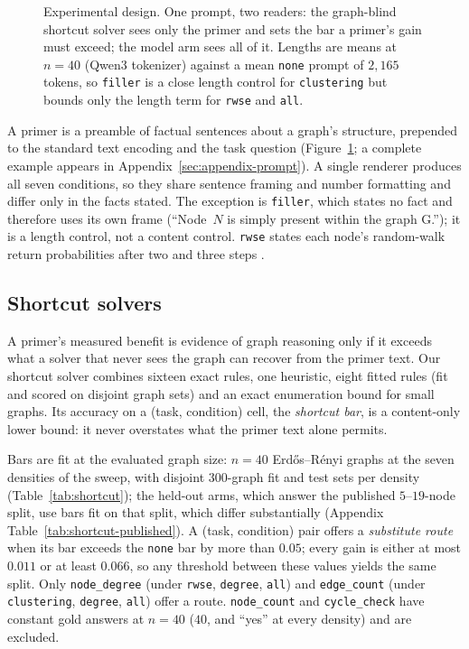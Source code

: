 \documentclass[11pt]{article}
\begin{document}
\begin{figure}[t]
\caption{Experimental design. One prompt, two readers: the graph-blind
shortcut solver sees only the primer and sets the bar a primer's gain must
exceed; the model arm sees all of it. Lengths are means at $n{=}40$ (Qwen3
tokenizer) against a mean \texttt{none} prompt of $2{,}165$ tokens, so
\texttt{filler} is a close length control for \texttt{clustering} but
bounds only the length term for \texttt{rwse} and \texttt{all}.}
\label{fig:design}
\end{figure}

A primer is a preamble of factual sentences about a graph's structure,
prepended to the standard text encoding and the task question
(Figure~\ref{fig:design}; a complete example appears in
Appendix~\ref{sec:appendix-prompt}). A single renderer produces all seven
conditions, so they share sentence framing and number formatting and differ
only in the facts stated. The exception is \texttt{filler}, which states no
fact and therefore uses its own frame (``Node~$N$ is simply present within
the graph G.''); it is a length control, not a content control.
\texttt{rwse} states each node's random-walk return probabilities after two
and three steps \citep{dwivedi2022graph}.

\subsection{Shortcut solvers}
\label{sec:shortcuts}

A primer's measured benefit is evidence of graph reasoning only if it
exceeds what a solver that never sees the graph can recover from the
primer text. Our shortcut solver combines sixteen exact rules, one
heuristic, eight fitted rules (fit and scored on disjoint graph sets) and an
exact enumeration bound for small graphs. Its accuracy on a (task,
condition) cell, the \emph{shortcut bar}, is a content-only lower bound: it
never overstates what the primer text alone permits.

Bars are fit at the evaluated graph size: $n{=}40$ Erd\H{o}s--R\'enyi
graphs at the seven densities of the sweep, with disjoint $300$-graph fit
and test sets per density (Table~\ref{tab:shortcut}); the held-out arms,
which answer the published $5$--$19$-node split, use bars fit on that split,
which differ substantially (Appendix
Table~\ref{tab:shortcut-published}). A (task, condition) pair offers a
\emph{substitute route} when its bar exceeds the \texttt{none} bar by more
than $0.05$; every gain is either at most $0.011$ or at least $0.066$, so
any threshold between these values yields the same split. Only
\texttt{node\_degree} (under \texttt{rwse}, \texttt{degree}, \texttt{all})
and \texttt{edge\_count} (under \texttt{clustering}, \texttt{degree},
\texttt{all}) offer a route. \texttt{node\_count} and \texttt{cycle\_check}
have constant gold answers at $n{=}40$ ($40$, and ``yes'' at every density)
and are excluded.
\end{document}
